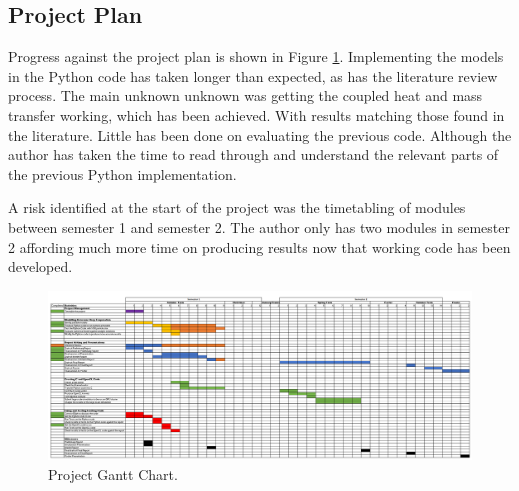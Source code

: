 \documentclass[../Interim_Report_Master]{subfiles}
\begin{document}
\begin{landscape}
\hypertarget{proj_plan}{\section*{Project Plan}\label{proj_plan}}
Progress against the project plan is shown in Figure \ref{Gantt_Chart}. Implementing the models in the Python code has taken longer than expected, as has the literature review process. The main unknown unknown was getting the coupled heat and mass transfer working, which has been achieved. With results matching those found in the literature. Little has been done on evaluating the previous code. Although the author has taken the time to read through and understand the relevant parts of the previous Python implementation. 

A risk identified at the start of the project was the timetabling of modules between semester 1 and semester 2. The author only has two modules in semester 2 affording much more time on producing results now that working code has been developed.

\vspace*{\fill}
\begin{figure}[h]
	\centering
	\includegraphics[width=1.4\textwidth]{Gantt_Chart_Updated_2.png}
	\caption{Project Gantt Chart.}
	\label{Gantt_Chart}
\end{figure}
\vfill
\end{landscape}
\end{document}

